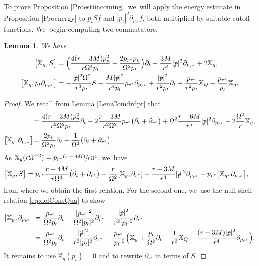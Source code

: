 \documentclass[JEP,XML,SOM,Unicode,published]{cedram}
\newcommand{\psfrac}[2]{\sfrac{(#1)}{#2}}
\theoremstyle{plain}
\newtheorem{lemma}[proposition]{Lemma}
\theoremstyle{definition}
\newcommand\T{{\mathbb{X}}}
\begin{document}
To prove Proposition \ref{Proestiincoming}, we~will apply the energy estimate in Proposition \ref{Proenergy} to $p_t Sf$ and $|p_t|^2 \partial_{p_{r^*}}f$, both multiplied by suitable cutoff functions. We~begin computing two commutators.

\begin{lemma}\label{LemComdrdprbis}
We have
\begin{align*}
\bigl[\T_g,S\bigr] &= \Bigl(\frac{4(r-3M)p_v^2}{r \Omega^4p_t}-\frac{2p_{r^*}p_v}{ \Omega^2p_t} \Bigr)\partial_t - \frac{3M}{r^4} |\slashed{p}|^2 \partial_{p_{r^*}}+2\T_g, \\
\bigl[ \T_g, p_t \partial_{p_{r^*}} \bigr] & = -\frac{|\slashed{p}|^2\Omega^2}{r^3 p_t} S-\frac{M|\slashed{p}|^2}{r^4 p_t}p_{r^*} \partial_{p_{r^*}}+\frac{|\slashed{p}|^2}{r^2 p_t} \partial_t+\frac{p_{r^*}}{r^2 p_t} \T_Q -\frac{p_{r^*}}{ p_t} \T_g.
\end{align*}
\end{lemma}
\begin{proof}
We recall from Lemma \ref{LemComdrdpr} that
\begin{align*}
[\T_g,\partial_{r^*}] &= \frac{4(r-3M)p_v^2}{r^2 \Omega^2p_t} \partial_t-2\frac{r-3M}{r^2 \Omega^2}p_{r^*}\bigl(\partial_t+ \partial_{r^*}\bigr)+ \Omega^2 \frac{r-6M}{r^5} |\slashed{p}|^2 \partial_{p_{r^*}}+2\frac{\Omega^2}{r}\T_g, \\[2pt]
\bigl[ \T_g, \partial_{p_{r^*}} \bigr] \! & = \frac{2p_v}{ \Omega^2p_t} \partial_t- \frac{1}{\Omega^2}\bigl(\partial_t+ \partial_{r^*} \bigr).
\end{align*}
As $ \T_g (r \Omega^{-2})=p_{r^*}\psfrac{r-4M}{r\Omega^4}$, we~have
\begin{align*}
\bigl[\T_g,S\bigr] &=p_{r^*}\frac{r-4M}{r\Omega^4}\bigl(\partial_t+\partial_{r^*} \bigr) +\frac{r}{\Omega^2} [\T_g,\partial_{r^*}]-\frac{r-3M}{r^4}|\slashed{p}|^2 \partial_{p_{r^*}}-p_{r^*} \bigl[ \T_g, \partial_{p_{r^*}} \bigr],
\end{align*}
from where we obtain the first relation. For the second one, we~use the null-shell relation \eqref{eq:defConsQua} to show
\begin{align*}
\bigl[ \T_g, \partial_{p_{r^*}} \bigr] & = \frac{p_{r^*}}{\Omega^2 p_t} \partial_t-\frac{|p_{r^*}|^2}{\Omega^2|p_t|^2} \partial_{r^*}-\frac{|\slashed{p}|^2}{r^2 |p_t|^2} \partial_{r^*} \\
& = \frac{p_{r^*}}{\Omega^2 p_t} \partial_t-\frac{|\slashed{p}|^2}{r^2 |p_t|^2} \partial_{r^*}-\frac{p_{r^*}}{ |p_t|^2}\Bigl(\T_g+\frac{p_t}{\Omega^2} \partial_t-\frac{1}{r^2} \T_Q-\frac{(r-3M)|\slashed{p}|^2}{r^4} \partial_{p_{r^*}} \Bigr).
\end{align*}
It remains to use $\T_g(p_t)=0$ and to rewrite $\partial_{r^*}$ in terms of $S$.
\end{proof}
\end{document}
